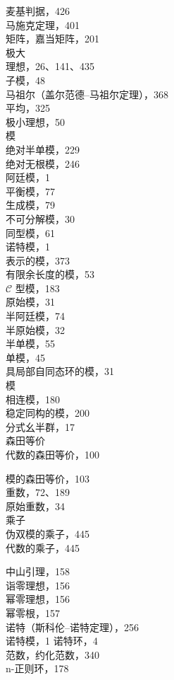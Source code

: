 麦基判据，426\\
马施克定理，401\\
矩阵，嘉当矩阵，201\\
极大\\
理想，26、141、435\\
子模，48\\
马祖尔（盖尔范德–马祖尔定理），368\\
平均，325\\
极小理想，50\\
模\\
绝对半单模，229\\
绝对无根模，246\\
阿廷模，1\\
平衡模，77\\
生成模，79\\
不可分解模，30\\
同型模，61\\
诺特模，1\\
表示的模，373\\
有限余长度的模，53\\
\(\mathcal{C}\) 型模，183\\
原始模，31\\
半阿廷模，74\\
半原始模，32\\
半单模，55\\
单模，45\\
具局部自同态环的模，31\\
模\\
相连模，180\\
稳定同构的模，200\\
分式幺半群，17\\
森田等价\\
代数的森田等价，100

模的森田等价，103\\
重数，72、189\\
原始重数，34\\
乘子\\
伪双模的乘子，445\\
代数的乘子，445


中山引理，158\\
诣零理想，156\\
幂零理想，156\\
幂零根，157\\
诺特（斯科伦–诺特定理），256\\
诺特模，1 诺特环，4\\
范数，约化范数，340\\
n-正则环，178

